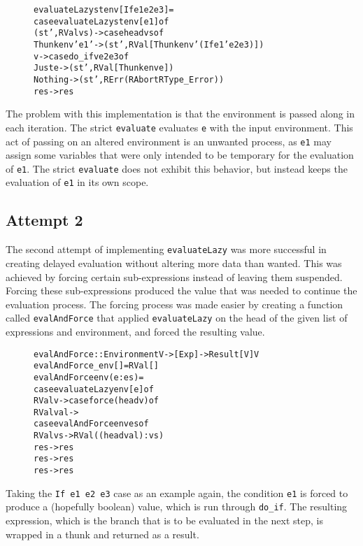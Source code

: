 \begin{figure}[H]
\begin{alltt}
  evaluateLazy st env [If e1 e2 e3]   =
    case evaluateLazy st env [e1] of
      (st', RVal vs)   -> case head vs of
        Thunk env' e1' -> (st', RVal [Thunk env' (If e1' e2 e3)])
        v              -> case do_if v e2 e3 of
          Just e  -> (st', RVal [Thunk env e])
          Nothing -> (st', RErr (RAbort RType_Error))
      res -> res
\end{alltt}
\end{figure}

The problem with this implementation is that the environment is passed along
in each iteration. The strict \texttt{evaluate} evaluates \texttt{e} with
the input environment. This act of passing on an altered environment is an
unwanted process, as \texttt{e1} may assign some variables that were only
intended to be temporary for the evaluation of \texttt{e1}. The strict
\texttt{evaluate} does not exhibit this behavior, but instead keeps the
evaluation of \texttt{e1} in its own scope.

\subsection{Attempt 2}
The second attempt of implementing \texttt{evaluateLazy} was more successful
in creating delayed evaluation without altering more data than wanted. This
was achieved by forcing certain sub-expressions instead of leaving them
suspended. Forcing these sub-expressions produced the value that was needed
to continue the evaluation process. The forcing process was made easier by
creating a function called \texttt{evalAndForce} that applied
\texttt{evaluateLazy} on the head of the given list of expressions and
environment, and forced the resulting value.

\begin{figure}[H]
\begin{alltt}
  evalAndForce :: Environment V -> [Exp] -> Result [V] V
  evalAndForce _env []    = RVal []
  evalAndForce env (e:es) =
    case evaluateLazy env [e] of
      RVal v -> case force (head v) of
        RVal val ->
          case evalAndForce env es of
            RVal vs -> RVal ((head val):vs)
            res -> res
        res -> res
      res -> res
\end{alltt}
\end{figure}

Taking the \texttt{If e1 e2 e3} case as an example again, the condition
\texttt{e1} is forced to produce a (hopefully boolean) value, which is run
through \texttt{do\_if}. The resulting expression, which is the branch that is
to be evaluated in the next step, is wrapped in a thunk and returned as a
result.

